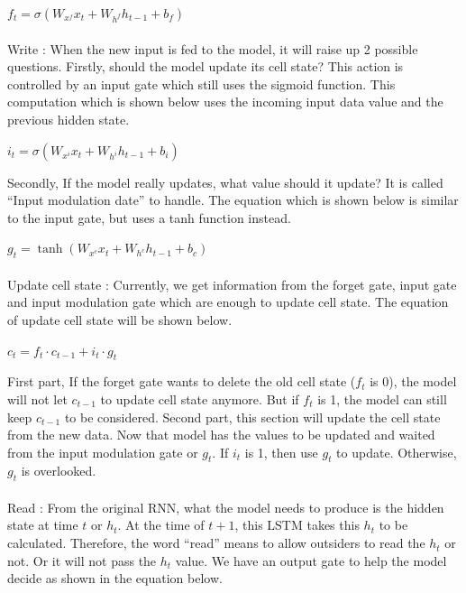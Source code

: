 \hfil $ f_t = \sigma(W_{x^f}x_t + W_{h^f}h_{t-1} + b_f) $ \par 

  \paragraph{}
Write : When the new input is fed to the model, it will raise up 2 possible questions. Firstly, should the model update its cell state? This action is controlled by an input gate which still uses the sigmoid function. This computation which is shown below uses the incoming input data value and the previous hidden state.

\hfil $ i_t = \sigma(W_{x^i}x_t + W_{h^i}h_{t-1} + b_i) $ \par
Secondly, If the model really updates, what value should it update? It is called “Input modulation date” to handle. The equation which is shown below is similar to the input gate, but uses a tanh function instead.

\hfil $ g_t = \tanh(W_{x^c}x_t + W_{h^c}h_{t-1} + b_c) $ \par 

\paragraph{}
Update cell state : Currently, we get information from the forget gate, input gate and input modulation gate which are enough to update cell state. The equation of update cell state will be shown below.

\hfil $c_t = f_t \cdot c_{t-1} + i_t \cdot g_t $ \par 
First part, If the forget gate wants to delete the old cell state ($f_t$ is 0), the model will not let $c_{t -1}$ to update cell state anymore. But if $f_t$ is 1, the model can still keep $c_{t -1}$ to be considered. Second part, this section will update the cell state from the new data. Now that model has the values to be updated and waited from the input modulation gate or $g_t$. If $i_t$ is 1, then use $g_t$ to update. Otherwise, $g_t$ is overlooked.

\paragraph{}
Read : From the original RNN, what the model needs to produce is the hidden state at time $t$ or $h_t$. At the time of $t+1$, this LSTM takes this $h_t$ to be calculated. Therefore, the word “read” means to allow outsiders to read the $h_t$ or not. Or it will not pass the $h_t$ value. We have an output gate to help the model decide as shown in the equation below. 

